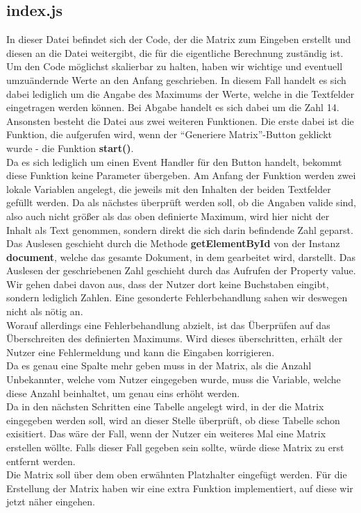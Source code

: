 \documentclass[a4paper,oneside,titlepage,12pt]{article}
\begin{document}
\subsection{index.js}
In dieser Datei befindet sich der Code, der die Matrix zum Eingeben erstellt und diesen an die Datei weitergibt, die für die eigentliche Berechnung zuständig ist. \\ Um den Code möglichst skalierbar zu halten, haben wir wichtige und eventuell umzuändernde Werte an den Anfang geschrieben. In diesem Fall handelt es sich dabei lediglich um die Angabe des Maximums der Werte, welche in die Textfelder eingetragen werden können. Bei Abgabe handelt es sich dabei um die Zahl 14. \\ Ansonsten besteht die Datei aus zwei weiteren Funktionen. Die erste dabei ist die Funktion, die aufgerufen wird, wenn der ``Generiere Matrix''-Button geklickt wurde - die Funktion \textbf{start()}. \\ Da es sich lediglich um einen Event Handler für den Button handelt, bekommt diese Funktion keine Parameter übergeben. Am Anfang der Funktion werden zwei lokale Variablen angelegt, die jeweils mit den Inhalten der beiden Textfelder gefüllt werden. Da als nächstes überprüft werden soll, ob die Angaben valide sind, also auch nicht größer als das oben definierte Maximum, wird hier nicht der Inhalt als Text genommen, sondern direkt die sich darin befindende Zahl geparst. \\ Das Auslesen geschieht durch die Methode \textbf{getElementById} von der Instanz \textbf{document}, welche das gesamte Dokument, in dem gearbeitet wird, darstellt. Das Auslesen der geschriebenen Zahl geschieht durch das Aufrufen der Property value. Wir gehen dabei davon aus, dass der Nutzer dort keine Buchstaben eingibt, sondern lediglich Zahlen. Eine gesonderte Fehlerbehandlung sahen wir deswegen nicht als nötig an. \\ Worauf allerdings eine Fehlerbehandlung abzielt, ist das Überprüfen auf das Überschreiten des definierten Maximums. Wird dieses überschritten, erhält der Nutzer eine Fehlermeldung und kann die Eingaben korrigieren. \\ Da es genau eine Spalte mehr geben muss in der Matrix, als die Anzahl Unbekannter, welche vom Nutzer eingegeben wurde, muss die Variable, welche diese Anzahl beinhaltet, um genau eins erhöht werden. \\ Da in den nächsten Schritten eine Tabelle angelegt wird, in der die Matrix eingegeben werden soll, wird an dieser Stelle überprüft, ob diese Tabelle schon exisitiert. Das wäre der Fall, wenn der Nutzer ein weiteres Mal eine Matrix erstellen wöllte. Falls dieser Fall gegeben sein sollte, würde diese Matrix zu erst entfernt werden. \\ Die Matrix soll über dem oben erwähnten Platzhalter eingefügt werden. Für die Erstellung der Matrix haben wir eine extra Funktion implementiert, auf diese wir jetzt näher eingehen. \\ 
\end{document}
